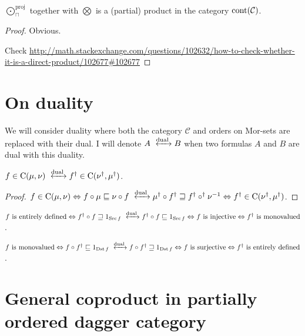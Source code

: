 \begin{thm}
  $\bigodot^{\text{proj}}_{\sqcap}$ together with $\bigotimes$ is a (partial) product in the
  category $\operatorname{cont} (\mathcal{C})$.
\end{thm}

\begin{proof}
  Obvious.
  
  Check
  \url{http://math.stackexchange.com/questions/102632/how-to-check-whether-it-is-a-direct-product/102677\#102677}
\end{proof}

\section{On duality}

We will consider duality where both the category $\mathcal{C}$ and orders on
Mor-sets are replaced with their dual. I will denote $A
\xleftrightarrow{\dual} B$ when two formulas $A$ and $B$ are dual with
this duality.

\begin{prop}
  $f \in \mathrm{C} (\mu, \nu) \xleftrightarrow{\dual} f^{\dagger}
  \in \mathrm{C} (\nu^{\dagger} , \mu^{\dagger})$.
\end{prop}

\begin{proof}
  $f \in \mathrm{C} (\mu, \nu) \Leftrightarrow f \circ \mu
  \sqsubseteq \nu \circ f \xleftrightarrow{\dual} \mu^{\dagger}
  \circ f^{\dagger} \sqsupseteq f^{\dagger} \circ^{\dagger} \nu^{- 1}
  \Leftrightarrow f^{\dagger} \in \mathrm{C} (\nu^{\dagger} ,
  \mu^{\dagger})$.
\end{proof}

$f \text{ is entirely defined} \Leftrightarrow f^{\dagger} \circ f \sqsupseteq
1_{\Src f} \xleftrightarrow{\dual} f^{\dagger} \circ f \sqsubseteq
1_{\Src f} \Leftrightarrow f \text{ is injective} \Leftrightarrow
f^{\dagger} \text{ is monovalued}$.

$f \text{ is monovalued} \Leftrightarrow f \circ f^{\dagger} \sqsubseteq
1_{\Dst f} \xleftrightarrow{\dual} f \circ f^{\dagger} \sqsupseteq
1_{\Dst f} \Leftrightarrow f \text{ is surjective} \Leftrightarrow
f^{\dagger} \text{ is entirely defined}$.

\section{General coproduct in partially ordered dagger category}

